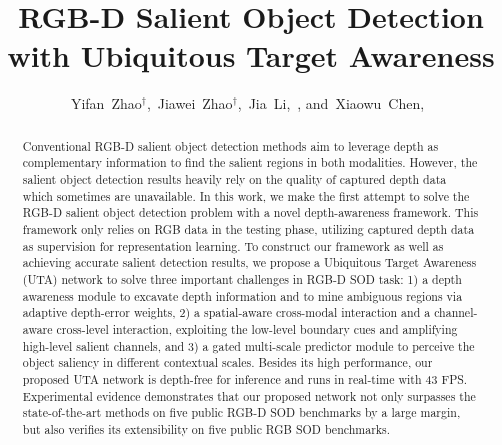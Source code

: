 \documentclass[journal]{IEEEtran}
\begin{document}
\title{RGB-D Salient Object Detection with Ubiquitous Target Awareness}

\author{Yifan~Zhao$^{\dagger}$,~Jiawei~Zhao$^{\dagger}$,~Jia~Li,~, and~Xiaowu~Chen,~}




\maketitle

\begin{abstract}
 Conventional RGB-D salient object detection methods aim to leverage depth as complementary information to find the salient regions in both modalities. However, the salient object detection results heavily rely on the quality of captured depth data which sometimes are unavailable. In this work, we make the first attempt to solve the RGB-D salient object detection problem with a novel depth-awareness framework. This framework only relies on RGB data in the testing phase, utilizing captured depth data as supervision for representation learning. To construct our framework as well as achieving accurate salient detection results, we propose a Ubiquitous Target Awareness (UTA) network to solve three important challenges in RGB-D SOD task: 1) a depth awareness module to excavate depth information and to mine ambiguous regions via adaptive depth-error weights, 2) a spatial-aware cross-modal interaction and a channel-aware cross-level interaction, exploiting the low-level boundary cues and amplifying high-level salient channels, and 3) a gated multi-scale predictor module to perceive the object saliency in different contextual scales. Besides its high performance, our proposed UTA network is depth-free for inference and runs in real-time with 43 FPS. Experimental evidence demonstrates that our proposed network not only surpasses the state-of-the-art methods on five public RGB-D SOD benchmarks by a large margin, but also verifies its extensibility on five public RGB SOD benchmarks.
 	
\end{abstract}
\end{document}
